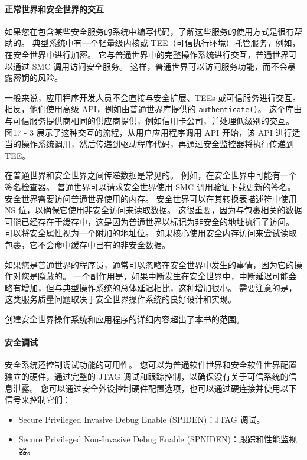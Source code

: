 \paragraph*{正常世界和安全世界的交互}

如果您在包含某些安全服务的系统中编写代码，了解这些服务的使用方式是很有帮助的。
典型系统中有一个轻量级内核或 TEE（可信执行环境）托管服务，例如，在安全世界中进行加密。
它与普通世界中的完整操作系统进行交互，普通世界可以通过 SMC 调用访问安全服务。
这样，普通世界可以访问服务功能，而不会暴露密钥的风险。

一般来说，应用程序开发人员不会直接与安全扩展、TEEs 或可信服务进行交互。
相反，他们使用高级 API，例如由普通世界库提供的 \lstinline!authenticate()!。
这个库由与可信服务提供商相同的供应商提供，例如信用卡公司，并处理低级别的交互。
图17 - 3 展示了这种交互的流程，从用户应用程序调用 API 开始，该 API 进行适当的操作系统调用，然后传递到驱动程序代码，再通过安全监控器将执行传递到 TEE。


在普通世界和安全世界之间传递数据是常见的。
例如，在安全世界中可能有一个签名检查器。
普通世界可以请求安全世界使用 SMC 调用验证下载更新的签名。
安全世界需要访问普通世界使用的内存。
安全世界可以在其转换表描述符中使用 NS 位，以确保它使用非安全访问来读取数据。
这很重要，因为与包裹相关的数据可能已经存在于缓存中，这是因为普通世界以标记为非安全的地址执行了访问。
可以将安全属性视为一个附加的地址位。
如果核心使用安全内存访问来尝试读取包裹，它不会命中缓存中已有的非安全数据。

如果您是普通世界的程序员，通常可以忽略在安全世界中发生的事情，因为它的操作对您是隐藏的。
一个副作用是，如果中断发生在安全世界中，中断延迟可能会略有增加，但与典型操作系统的总体延迟相比，这种增加很小。
需要注意的是，这类服务质量问题取决于安全世界操作系统的良好设计和实现。

创建安全世界操作系统和应用程序的详细内容超出了本书的范围。

\paragraph*{安全调试}

安全系统还控制调试功能的可用性。
您可以为普通软件世界和安全软件世界配置独立的硬件，通过完整的 JTAG 调试和跟踪控制，以确保没有关于可信系统的信息泄露。
您可以通过安全外设控制硬件配置选项，也可以通过硬连接并使用以下信号来控制它们：

\begin{itemize}
\item
  Secure Privileged Invasive Debug Enable (SPIDEN)：JTAG 调试。
\item
  Secure Privileged Non-Invasive Debug Enable (SPNIDEN)：跟踪和性能监视器。
\end{itemize}

